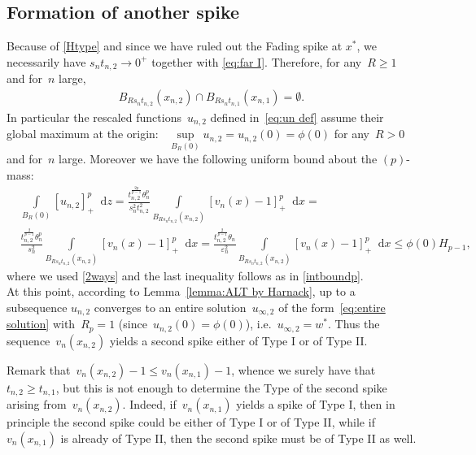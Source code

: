 \documentclass[10pt]{amsart}
\newcommand{\dd}{\mathop{}\!\mathrm{d}}
\newcommand{\eps}{\varepsilon}
\renewcommand{\to}{\rightarrow}
\begin{document}
\subsection{Formation of another spike}\label{subs:5.3}
Because of \eqref{Htype} and since we have ruled out the Fading spike at $x^*$,
we necessarily have $s_n t_{n,2}\to 0^+$ together with \eqref{eq:far I}. Therefore, for any~$R\geq 1$ and for~$n$ large,
    \begin{align}\label{eq:5.3}
        B_{R s_n t_{n,2}} (x_{n,2}) \cap B_{R s_n t_{n,1}} (x_{n,1})=\emptyset.
    \end{align}
    In particular the rescaled functions~$u_{n,2}$ defined in~\eqref{eq:un def} assume their global maximum at the origin:~
    $\sup\limits_{B_R(0)} u_{n,2}=u_{n,2}(0)=\phi(0)$ for any~$R>0$ and for~$n$ large. Moreover we have the following
    uniform bound about the $(p)$-mass:
    \begin{align*}
        &\int\limits_{B_R(0)} [u_{n,2}]_+^p\dd{z}
        =\frac{t_{n,2}^{\frac{2p}{p-1}}\theta_n^p }{s_n^2 t_{n,2}^2} \int\limits_{B_{R s_n t_{n,2}}(x_{n,2})} [v_n(x)-1]_+^p\dd{x}=\\
        &\frac{t_{n,2}^{\frac{2}{p-1}}\theta_n^p }{s_n^2}\int\limits_{B_{R s_n t_{n,2}}(x_{n,2})} [v_n(x)-1]_+^p\dd{x}=
        \frac{t_{n,2}^{\frac{2}{p-1}}\theta_n }{\eps_n^2}\int\limits_{B_{R s_n t_{n,2}}(x_{n,2})} [v_n(x)-1]_+^p\dd{x}\leq \phi(0)H_{p-1},
    \end{align*}
    where we used \eqref{2ways} and the last inequality follows as in \eqref{intboundp}.\\
    At this point, according to Lemma~\ref{lemma:ALT by Harnack}, up to a subsequence $u_{n,2}$ converges to an entire
    solution~$u_{\infty,2}$ of the form~\eqref{eq:entire solution} with~$R_p=1$ (since~$u_{n,2}(0)=\phi(0)$), i.e.~$u_{\infty,2}=w^*$.
    Thus the sequence~$v_n(x_{n,2})$ yields a second spike either of Type I or of Type II.

    Remark that~$v_n(x_{n,2})-1\leq v_n(x_{n,1})-1$, whence we surely have that $t_{n,2}\geq t_{n,1}$,
    but this is not enough to determine the Type of the second spike arising from~$v_n(x_{n,2})$.
    Indeed, if~$v_n(x_{n,1})$ yields a spike of Type I, then in principle the second spike could be either of Type I or of Type II,
    while if $v_n(x_{n,1})$ is already of Type II, then the second spike must be of Type II as well.

\bigskip
\end{document}

